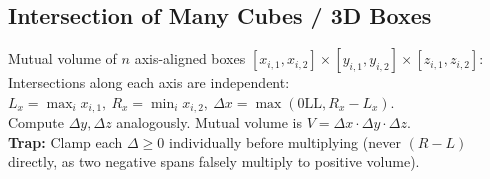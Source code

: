 \subsection{Intersection of Many Cubes / 3D Boxes}
Mutual volume of $n$ axis-aligned boxes $[x_{i,1}, x_{i,2}] \times [y_{i,1}, y_{i,2}] \times [z_{i,1}, z_{i,2}]$: \\
Intersections along each axis are independent: \\
$L_x = \max_i x_{i,1}, \ R_x = \min_i x_{i,2}, \ \Delta x = \max(0\text{LL}, R_x - L_x)$. \\
Compute $\Delta y, \Delta z$ analogously. Mutual volume is $V = \Delta x \cdot \Delta y \cdot \Delta z$. \\
\textbf{Trap:} Clamp each $\Delta \ge 0$ individually before multiplying (never $(R-L)$ directly, as two negative spans falsely multiply to positive volume).

